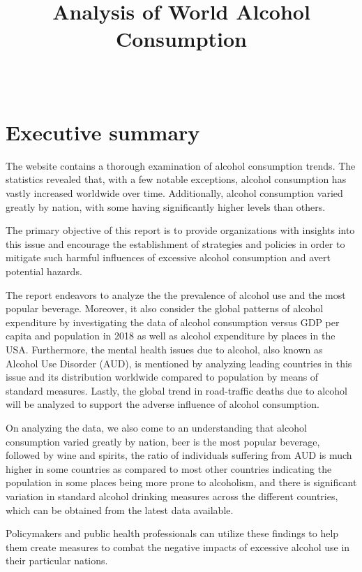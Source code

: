 \documentclass[11pt,a4paper,]{article}
\title{Analysis of World Alcohol Consumption}
\author{\sf{\Large\textbf{Aishwarya Anil Kumar}\\\large \href{mailto:aani0005@monash.student.com}{\nolinkurl{aani0005@monash.student.com}}\\[0.5cm]}{\Large\textbf{Amrita Jena}\\\large \href{mailto:ajen0022@student.monash.edu}{\nolinkurl{ajen0022@student.monash.edu}}\\[0.5cm]}{\Large\textbf{Priyasha Saini}\\\large \href{mailto:psai0005@student.monash.edu}{\nolinkurl{psai0005@student.monash.edu}}\\[0.5cm]}{\Large\textbf{Xuan Nhat Minh Nguyen}\\\large \href{mailto:xngu0008@student.monash.edu}{\nolinkurl{xngu0008@student.monash.edu}}\\[0.5cm]}}
\date{\sf\Date~\Month~\Year}
\makeatletter
\def\titlepage{\front{\expandafter{\@title}}{\@author}{\@organization}}
\makeatother
\begin{document}
\titlepage

{
\setcounter{tocdepth}{2}
\tableofcontents
}
\pagebreak

\section{Executive summary}\label{executive-summary}

The \textcite{owidalcoholconsumption} website contains a thorough examination of alcohol consumption trends. The statistics revealed that, with a few notable exceptions, alcohol consumption has vastly increased worldwide over time. Additionally, alcohol consumption varied greatly by nation, with some having significantly higher levels than others.

The primary objective of this report is to provide organizations with insights into this issue and encourage the establishment of strategies and policies in order to mitigate such harmful influences of excessive alcohol consumption and avert potential hazards.

The report endeavors to analyze the the prevalence of alcohol use and the most popular beverage. Moreover, it also consider the global patterns of alcohol expenditure by investigating the data of alcohol consumption versus GDP per capita and population in 2018 as well as alcohol expenditure by places in the USA. Furthermore, the mental health issues due to alcohol, also known as Alcohol Use Disorder (AUD), is mentioned by analyzing leading countries in this issue and its distribution worldwide compared to population by means of standard measures. Lastly, the global trend in road-traffic deaths due to alcohol will be analyzed to support the adverse influence of alcohol consumption.

On analyzing the data, we also come to an understanding that alcohol consumption varied greatly by nation, beer is the most popular beverage, followed by wine and spirits, the ratio of individuals suffering from AUD is much higher in some countries as compared to most other countries indicating the population in some places being more prone to alcoholism, and there is significant variation in standard alcohol drinking measures across the different countries, which can be obtained from the latest data available.

Policymakers and public health professionals can utilize these findings to help them create measures to combat the negative impacts of excessive alcohol use in their particular nations.
\end{document}
